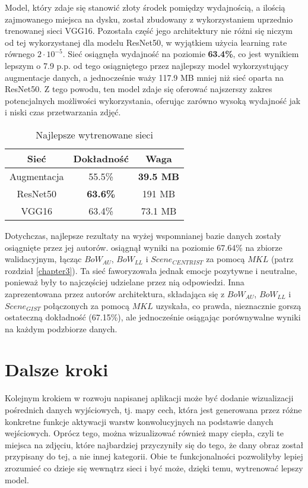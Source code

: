 Model, który zdaje się stanowić złoty środek pomiędzy wydajnością, a ilością zajmowanego miejsca na dysku, został zbudowany z wykorzystaniem uprzednio trenowanej sieci VGG16. Pozostała część jego architektury nie różni się niczym od tej wykorzystanej dla modelu ResNet50, w wyjątkiem użycia learning rate równego $2\cdot10^{-5}$. Sieć osiągnęła wydajność na poziomie \textbf{63.4\%}, co jest wynikiem lepszym o 7.9 p.p. od tego osiągniętego przez najlepszy model wykorzystujący augmentacje danych, a jednocześnie waży 117.9 MB mniej niż sieć oparta na ResNet50. Z tego powodu, ten model zdaje się oferować najszerszy zakres potencjalnych możliwości wykorzystania, oferując zarówno wysoką wydajność jak i niski czas przetwarzania zdjęć.

\begin{table}[H]
  \centering
  \caption{Najlepsze wytrenowane sieci}
    \begin{tabular}{ |c|c|c| }
    \hline
    Sieć & Dokładność & Waga \\
    \hline
    Augmentacja & 55.5\% & \textbf{39.5 MB} \\
    ResNet50 & \textbf{63.6\%} & 191 MB \\
    VGG16 & 63.4\% & 73.1 MB \\ 
    \hline
    \end{tabular}
  \label{tab:7.1}
\end{table}

Dotychczas, najlepsze rezultaty na wyżej wspomnianej bazie danych zostały osiągnięte przez jej autorów. \cite{GAD} osiągnął wyniki na poziomie 67.64\% na zbiorze walidacyjnym, łącząc $BoW_{AU}$, $BoW_{LL}$ i $Scene_{CENTRIST}$ za pomocą $MKL$ (patrz rozdział \ref{chapter3}). Ta sieć faworyzowała jednak emocje pozytywne i neutralne, ponieważ były to najczęściej udzielane przez nią odpowiedzi. Inna zaprezentowana przez autorów architektura, składająca się z $BoW_{AU}$, $BoW_{LL}$ i $Scene_{GIST}$ połączonych za pomocą $MKL$ uzyskała, co prawda, nieznacznie gorszą ostateczną dokładność (67.15\%), ale jednocześnie osiągając porównywalne wyniki na każdym podzbiorze danych.


\section{Dalsze kroki}
Kolejnym krokiem w rozwoju napisanej aplikacji może być dodanie wizualizacji pośrednich danych wyjściowych, tj. mapy cech, która jest generowana przez różne konkretne funkcje aktywacji warstw konwolucyjnych na podstawie danych wejściowych. Oprócz tego, można wizualizować również mapy ciepła, czyli te miejsca na zdjęciu, które najbardziej przyczyniły się do tego, że dany obraz został przypisany do tej, a nie innej kategorii. Obie te funkcjonalności pozwoliłyby lepiej zrozumieć co dzieje się wewnątrz sieci i być może, dzięki temu, wytrenować lepszy model.

